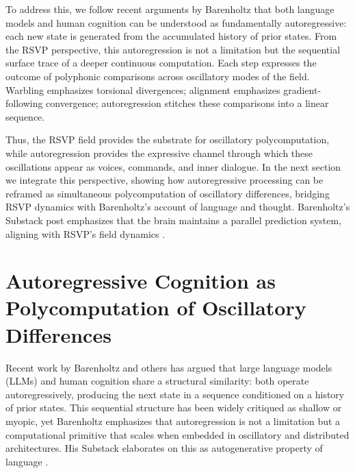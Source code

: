 \documentclass[a4paper,11pt]{article}
\begin{document}
To address this, we follow recent arguments by Barenholtz \citep{barenholtz2025autoregressive} that both language models and human cognition can be understood as fundamentally autoregressive: each new state is generated from the accumulated history of prior states. From the RSVP perspective, this autoregression is not a limitation but the sequential surface trace of a deeper continuous computation. Each step expresses the outcome of polyphonic comparisons across oscillatory modes of the field. Warbling emphasizes torsional divergences; alignment emphasizes gradient-following convergence; autoregression stitches these comparisons into a linear sequence.

Thus, the RSVP field provides the substrate for oscillatory polycomputation, while autoregression provides the expressive channel through which these oscillations appear as voices, commands, and inner dialogue. In the next section we integrate this perspective, showing how autoregressive processing can be reframed as simultaneous polycomputation of oscillatory differences, bridging RSVP dynamics with Barenholtz’s account of language and thought. Barenholtz's Substack post emphasizes that the brain maintains a parallel prediction system, aligning with RSVP's field dynamics \citep{barenholtz2025autoregressive}.

\section{Autoregressive Cognition as Polycomputation of Oscillatory Differences}
\label{sec:autoregression}

Recent work by Barenholtz and others \citep{barenholtz2025autoregressive} has argued that large language models (LLMs) and human cognition share a structural similarity: both operate autoregressively, producing the next state in a sequence conditioned on a history of prior states. This sequential structure has been widely critiqued as shallow or myopic, yet Barenholtz emphasizes that autoregression is not a limitation but a computational primitive that scales when embedded in oscillatory and distributed architectures. His Substack elaborates on this as autogenerative property of language \citep{barenholtzautogeneration}.
\end{document}
